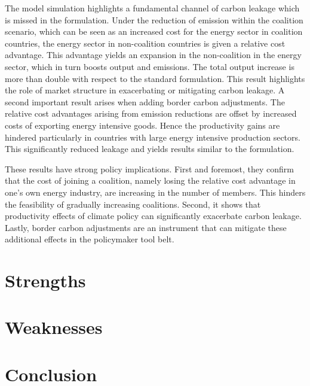 \documentclass[american]{scrartcl}
\begin{document}
The model simulation highlights a fundamental channel of carbon leakage which is missed in the \citeauthor{Armington1969} formulation. Under the reduction of emission within the coalition scenario, which can be seen as an increased cost for the energy sector in coalition countries, the energy sector in non-coalition countries is given a relative cost advantage. This advantage yields an expansion in the non-coalition in the energy sector, which in turn boosts output and emissions. The total output increase is more than double with respect to the standard \citeauthor{Armington1969} formulation. This result highlights the role of market structure in exacerbating or mitigating carbon leakage. A second important result arises when adding border carbon adjustments. The relative cost advantages arising from emission reductions are offset by increased costs of exporting energy intensive goods. Hence the productivity gains are hindered particularly in countries with large energy intensive production sectors. This significantly reduced leakage and yields results similar to the \citeauthor{Armington1969} formulation.

These results have strong policy implications. First and foremost, they confirm that the cost of joining a coalition, namely losing the relative cost advantage in one's own energy industry, are increasing in the number of members. This hinders the feasibility of gradually increasing coalitions. Second, it shows that productivity effects of climate policy can significantly exacerbate carbon leakage. Lastly, border carbon adjustments are an instrument that can mitigate these additional effects in the policymaker tool belt.

\newpage
\section{Strengths}



\newpage
\section{Weaknesses}

\newpage
\section{Conclusion}


\newpage
\nocite{*}
\printbibliography
\end{document}
